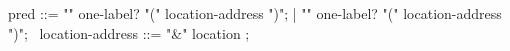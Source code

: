\begin{syntax}
  pred ::= "\initialized"  one-label? "(" location-address ")";
       | "\dangling"  one-label? "(" location-address ")";
       \
  location-address ::= "&" location ;
\end{syntax}

